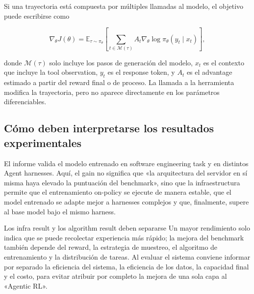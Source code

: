 Si una trayectoria está compuesta por múltiples llamadas al modelo, el objetivo puede escribirse como

$$
\nabla_\theta J(\theta)
=\mathbb{E}_{\tau\sim\pi_\theta}
\left[\sum_{t\in\mathcal{M}(\tau)} A_t\nabla_\theta\log\pi_\theta(y_t\mid x_t)\right],
$$

donde $\mathcal{M}(\tau)$ solo incluye los pasos de generación del modelo, $x_t$ es el contexto que incluye la tool observation, $y_t$ es el response token, y $A_t$ es el advantage estimado a partir del reward final o de proceso. La llamada a la herramienta modifica la trayectoria, pero no aparece directamente en los parámetros diferenciables.


\subsection{Cómo deben interpretarse los resultados experimentales}

El informe valida el modelo entrenado en software engineering task y en distintos Agent harnesses. Aquí, el gain no significa que «la arquitectura del servidor en sí misma haya elevado la puntuación del benchmark», sino que la infraestructura permite que el entrenamiento on-policy se ejecute de manera estable, que el model entrenado se adapte mejor a harnesses complejos y que, finalmente, supere al base model bajo el mismo harness.



\begin{warningbox}{Los infra result y los algorithm result deben separarse}
Un mayor rendimiento solo indica que se puede recolectar experiencia más rápido; la mejora del benchmark también depende del reward, la estrategia de muestreo, el algoritmo de entrenamiento y la distribución de tareas. Al evaluar el sistema conviene informar por separado la eficiencia del sistema, la eficiencia de los datos, la capacidad final y el costo, para evitar atribuir por completo la mejora de una sola capa al «Agentic RL».
\end{warningbox}

